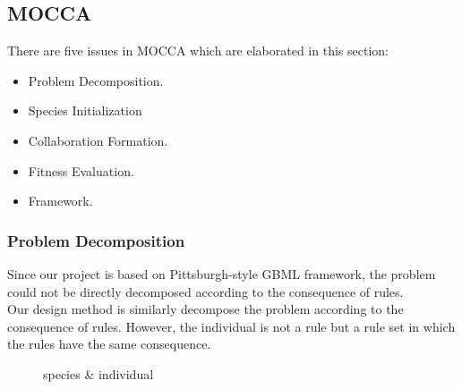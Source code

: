 \documentclass[conference,compsoc]{IEEEtran}
\begin{document}
\subsection{MOCCA}
There are five issues in MOCCA which are elaborated in this section: 
\begin{itemize}
	\item Problem Decomposition.
	\item Species Initialization
	\item Collaboration Formation.
	\item Fitness Evaluation.
	\item Framework.
\end{itemize}
\subsubsection{Problem Decomposition}
Since our project is based on Pittsburgh-style GBML framework, the problem could not be directly decomposed according to the consequence of rules.\\
\indent Our design method is similarly decompose the problem according to the consequence of rules. However, the individual is not a rule but a rule set in which the rules have the same consequence.
\begin{figure}[htbp]%
	\centering
	\caption{species \& individual}
	\label{species.png} 
\end{figure}
\end{document}
